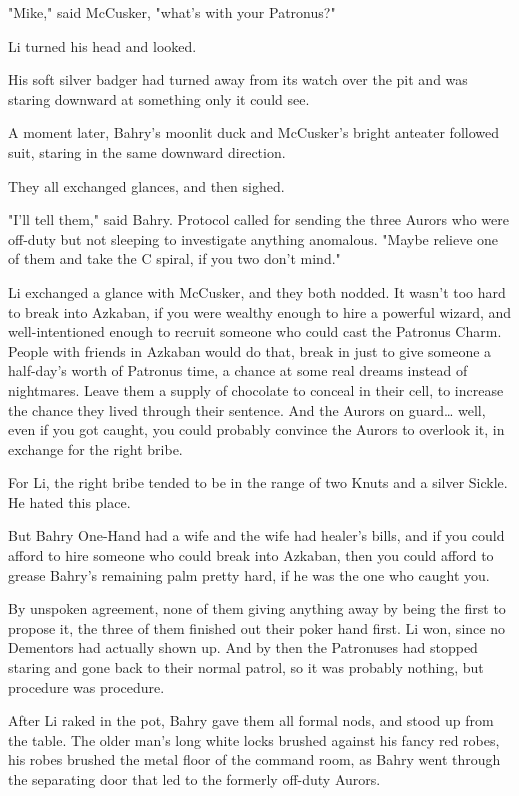 "Mike," said McCusker, "what's with your Patronus?"

Li turned his head and looked.

His soft silver badger had turned away from its watch over the pit and was 
staring downward at something only it could see.

A moment later, Bahry's moonlit duck and McCusker's bright anteater followed 
suit, staring in the same downward direction.

They all exchanged glances, and then sighed.

"I'll tell them," said Bahry. Protocol called for sending the three Aurors who 
were off-duty but not sleeping to investigate anything anomalous. "Maybe 
relieve one of them and take the C spiral, if you two don't mind."

Li exchanged a glance with McCusker, and they both nodded. It wasn't too hard 
to break into Azkaban, if you were wealthy enough to hire a powerful wizard, 
and well-intentioned enough to recruit someone who could cast the Patronus 
Charm. People with friends in Azkaban would do that, break in just to give 
someone a half-day's worth of Patronus time, a chance at some real dreams 
instead of nightmares. Leave them a supply of chocolate to conceal in their 
cell, to increase the chance they lived through their sentence. And the Aurors 
on guard{\ldots} well, even if you got caught, you could probably convince the 
Aurors to overlook it, in exchange for the right bribe.

For Li, the right bribe tended to be in the range of two Knuts and a silver 
Sickle. He hated this place.

But Bahry One-Hand had a wife and the wife had healer's bills, and if you could 
afford to hire someone who could break into Azkaban, then you could afford to 
grease Bahry's remaining palm pretty hard, if he was the one who caught you.

By unspoken agreement, none of them giving anything away by being the first to 
propose it, the three of them finished out their poker hand first. Li won, 
since no Dementors had actually shown up. And by then the Patronuses had 
stopped staring and gone back to their normal patrol, so it was probably 
nothing, but procedure was procedure.

After Li raked in the pot, Bahry gave them all formal nods, and stood up from 
the table. The older man's long white locks brushed against his fancy red 
robes, his robes brushed the metal floor of the command room, as Bahry went 
through the separating door that led to the formerly off-duty Aurors.

